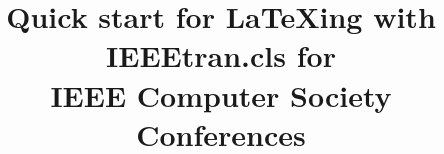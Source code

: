\documentclass[conference]{IEEEtran}
\begin{document}

\title{Quick start for LaTeXing with IEEEtran.cls for\\ IEEE Computer Society Conferences}

\author{%
  \and
}


\maketitle

%
%
\iffalse
    \makeatletter
    \def\ps@IEEEtitlepagestyle{%
      \def\@oddfoot{\mycopyrightnotice}%
      \def\@evenfoot{}%
    }
    \makeatother
    \def\mycopyrightnotice{%
      \begin{minipage}{\textwidth}
        \footnotesize
        1551-3203 \copyright 2015 IEEE.
        Personal use is permitted, but republication/redistribution requires IEEE permission.
        \\
        See \url{https://www.ieee.org/publications_standards/publications/rights/index.html} for more information.
      \end{minipage}
      \gdef\mycopyrightnotice{}%
    }
\fi

\begin{abstract}
  \blindtext
\end{abstract}

%
\IEEEpeerreviewmaketitle
\end{document}
